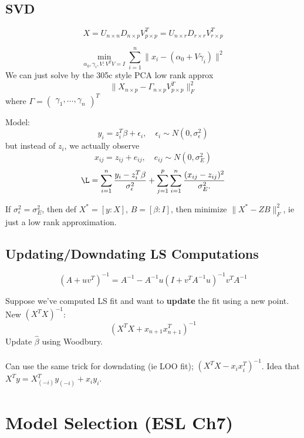 \documentclass{article}
\begin{document}
\subsection{SVD}
$$X = U_{n\times n} D_{n\times p} V^T_{p\times p} = U_{n\times r} D_{r\times r} V^T_{r\times p}$$
\begin{example}
    $$\min_{\alpha_0,\gamma_i, V:V^T V  =I } \sum_{i=1}^n \|x_i - (\alpha_0 + V\gamma_i)\|^2 $$
We can just solve by the 305c style PCA low rank approx 
    $$\|X_{n\times p} - \Gamma_{n\times p} V_{p\times p}^T \|_F^2 $$
    where $\Gamma = \begin{pmatrix}
        \gamma_1,\ldots ,\gamma_n
    \end{pmatrix}^T$
\end{example}
\begin{example}
Model:
$$y_i = z_i^T \beta + \epsilon_i, \quad \epsilon_i \sim N(0,\sigma^2_\epsilon) $$
but instead of $z_i$, we actually observe $$x_{ij} = z_{ij} + e_{ij}, \quad e_{ij}\sim N(0,\sigma^2_E) $$
$$\L = \sum_{i=1}^n \frac{y_i - z_i^T \beta}{\sigma^2_\epsilon} + \sum_{j=1}^p \sum_{i=1}^n \frac{(x_{ij} - z_{ij})^2}{\sigma^2_E.}$$

If $\sigma^2_\epsilon = \sigma^2_E$, then def $X^* = [y:X]$, $B = [\beta:I]$, then minimize $\|X^* -ZB\|_F^2 $, ie just a low rank approximation. 
\end{example}
\subsection{Updating/Downdating LS Computations}
\begin{fact}
    $$(A+uv^T)^{-1} = A^{-1} - A^{-1} u(I + v^T A^{-1} u)^{-1} v^T A^{-1} $$
\end{fact}
Suppose we've computed LS fit and want to \textbf{update} the fit using a new point. New $(X^TX)^{-1}$:
$$(X^TX + x_{n+1}x_{n+1}^T)^{-1} $$
Update $\hat \beta$ using Woodbury.\\\\
Can use the same trick for downdating (ie LOO fit); $(X^TX - x_ix_i^T)^{-1}$. Idea that $X^T y = X_{(-i)}^T y_{(-i)} + x_i y_i $.

\section{Model Selection (ESL Ch7)}
\end{document}
